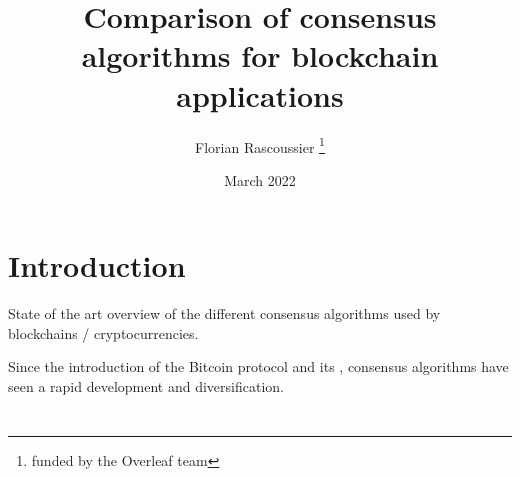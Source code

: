 \documentclass[12pt]{article} %
\title{Comparison of consensus algorithms for blockchain applications}
\author{Florian Rascoussier \thanks{funded by the Overleaf team}}
\date{March 2022}
\begin{document}

\newpage


\newpage


\section{Introduction }
State of the art overview of the different consensus 
algorithms used by blockchains / cryptocurrencies.

Since the introduction of the Bitcoin protocol and its 
 \cite{Nakamoto2009-uw}, consensus algorithms have 
seen a rapid development and diversification.

\section{}







\restoregeometry
\end{document}
